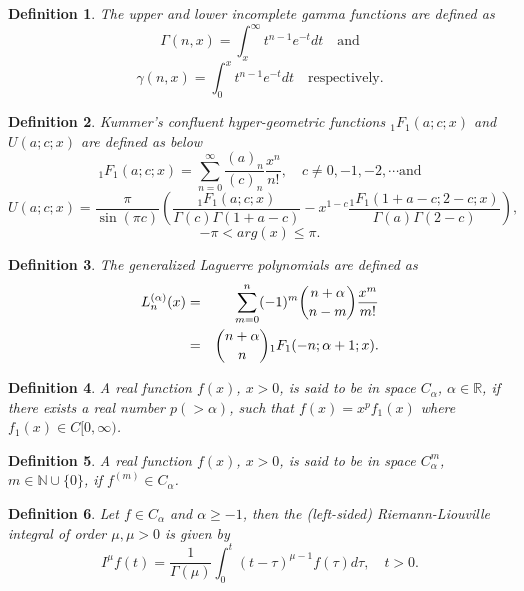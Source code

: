 \documentclass[12pt]{article}
\newtheorem{Def}{Definition}[section]
\numberwithin{equation}{section}
\begin{document}
\begin{Def}
The upper and lower incomplete gamma functions are defined as
\begin{equation}
\Gamma(n,x) = \int_{x}^\infty  t^{n-1} e^{-t}dt\quad \textrm{and}
\end{equation}
\begin{equation}
\gamma(n,x) = \int_{0}^x  t^{n-1} e^{-t}dt \quad \textrm{respectively}.
\end{equation}
\end{Def}

\begin{Def}
Kummer's confluent hyper-geometric functions $_{1}F_{1}(a;c;x)$ and  $U(a;c;x)$ are defined as below
\begin{equation}
_{1}F_{1}(a;c;x) = \sum_{n=0}^\infty \frac{(a)_n}{(c)_n} \frac{x^n}{n!},\quad c\ne 0,-1,-2,\cdots  \textrm{and} 
\end{equation}
\begin{equation}
U(a;c;x) = \frac{\pi}{\sin(\pi c)}\left(\frac{_{1}F_{1}(a;c;x)}{\Gamma(c)\Gamma(1+a-c)}-x^{1-c}\frac{_{1}F_{1}(1+a-c;2-c;x)}{\Gamma(a)\Gamma(2-c)}\right),
\end{equation}
\begin{equation}
-\pi<arg (x) \leq \pi.\nonumber
\end{equation}
\end{Def}

\begin{Def}\label{6.2.1}
The generalized Laguerre polynomials are defined as
\begin{eqnarray}
L_{n}^{(\alpha)}(x) &=& \sum_{m=0}^n (-1)^m \dbinom{n+\alpha}{n-m}\frac{x^m}{m!}\\
&=& \dbinom{n+\alpha}{n} {}_{1}F_{1}(-n;\alpha+1;x).
\end{eqnarray}
\end{Def}

\begin{Def}
A real function $f(x)$, $x>0$, is said to be in space $C_\alpha$, $\alpha\in\mathbb{R}$, if there exists a real number $p (>\alpha)$, such that $f(x)=x^p f_1(x) $ where $f_1(x)\in C[0,\infty)$.
\end{Def}

\begin{Def}
A real function $f(x)$, $x > 0$, is said to be in space $C^m_\alpha$, $m\in\mathbb{N}\cup \{0\}$, if $ f^{(m)} \in C_\alpha$.
\end{Def}
\begin{Def}
Let $f\in C_\alpha $ and $\alpha \geq -1$, then the (left-sided) Riemann-Liouville integral of order $\mu, \mu> 0 $ is given by
\begin{equation}
I^\mu f(t)=\frac{1}{\Gamma(\mu)} \int_{0}^t (t-\tau)^{\mu-1}f(\tau)d\tau,\quad t>0.
\end{equation}
\end{Def}
\end{document}
